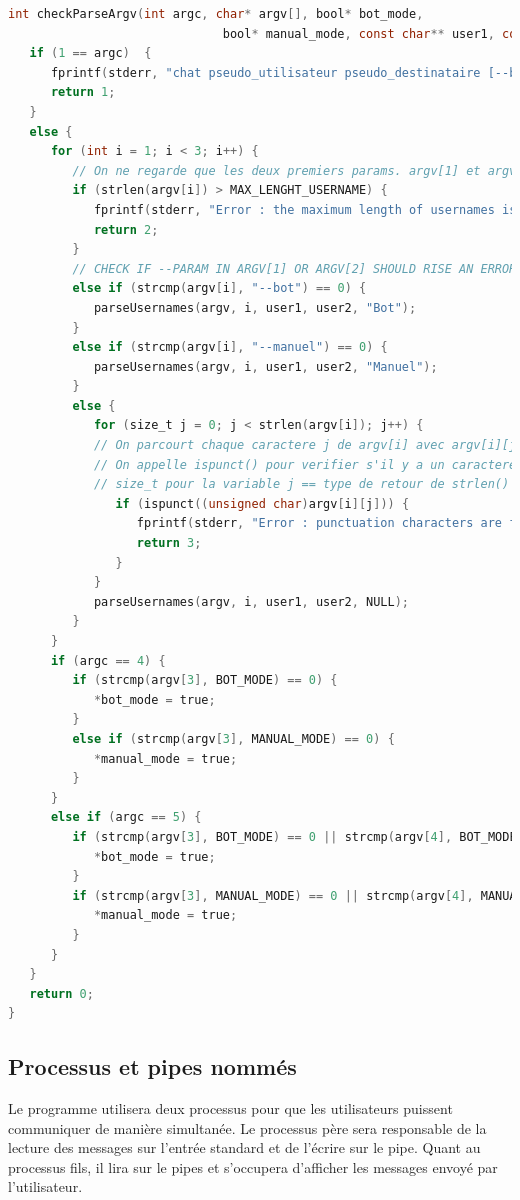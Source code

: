 \documentclass[utf8]{article}
\begin{document}
\begin{lstlisting}[language=C, caption=checkParseArgv, basicstyle=footnotesize]
	int checkParseArgv(int argc, char* argv[], bool* bot_mode, 
                              bool* manual_mode, const char** user1, const char** user2) {
   if (1 == argc)  {
      fprintf(stderr, "chat pseudo_utilisateur pseudo_destinataire [--bot] [--manuel]\n");
      return 1;
   }
   else {
      for (int i = 1; i < 3; i++) {
         // On ne regarde que les deux premiers params. argv[1] et argv[2] correspondant aux pseudonymes
         if (strlen(argv[i]) > MAX_LENGHT_USERNAME) {
            fprintf(stderr, "Error : the maximum length of usernames is 30.\n");
            return 2;
         }
         // CHECK IF --PARAM IN ARGV[1] OR ARGV[2] SHOULD RISE AN ERROR OR BE CONSIDERED AS AN USERNAME
         else if (strcmp(argv[i], "--bot") == 0) {
            parseUsernames(argv, i, user1, user2, "Bot");
         } 
         else if (strcmp(argv[i], "--manuel") == 0) {
            parseUsernames(argv, i, user1, user2, "Manuel");
         }
         else {
            for (size_t j = 0; j < strlen(argv[i]); j++) {
            // On parcourt chaque caractere j de argv[i] avec argv[i][j]
            // On appelle ispunct() pour verifier s'il y a un caractere de ponctuation dans chaque param.
            // size_t pour la variable j == type de retour de strlen() (long unsigned int)
               if (ispunct((unsigned char)argv[i][j])) {
                  fprintf(stderr, "Error : punctuation characters are forbidden for usernames.\n");
                  return 3;
               }
            }
            parseUsernames(argv, i, user1, user2, NULL);
         }  
      }
      if (argc == 4) {
         if (strcmp(argv[3], BOT_MODE) == 0) {
            *bot_mode = true;
         }
         else if (strcmp(argv[3], MANUAL_MODE) == 0) {
            *manual_mode = true;
         }
      }
      else if (argc == 5) {
         if (strcmp(argv[3], BOT_MODE) == 0 || strcmp(argv[4], BOT_MODE) == 0) {
            *bot_mode = true;
         }
         if (strcmp(argv[3], MANUAL_MODE) == 0 || strcmp(argv[4], MANUAL_MODE) == 0) {
            *manual_mode = true;
         }
      }
   }
   return 0;
}
\end{lstlisting}

\subsection{Processus et pipes nommés}
Le programme utilisera deux processus pour que les utilisateurs puissent communiquer de manière simultanée.
Le processus père sera responsable de la lecture des messages sur l'entrée standard et de l'écrire sur le pipe.
Quant au processus fils, il lira sur le pipes et s'occupera d'afficher les messages envoyé par l'utilisateur.
\end{document}
